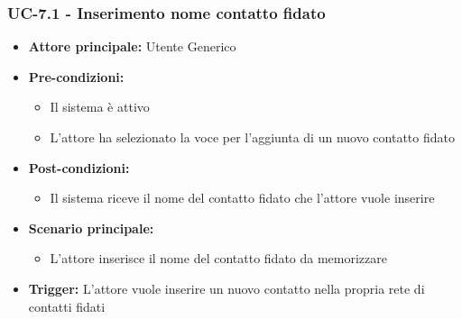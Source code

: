 \documentclass[a4paper,12pt]{article}
\begin{document}
\subsubsection{UC-7.1 - Inserimento nome contatto fidato} \label{subsec:UC-7.1}
\begin{itemize}
    \item \textbf{Attore principale:} Utente Generico
    \item \textbf{Pre-condizioni:}
    \begin{itemize}
        \item Il sistema è attivo
        \item L'attore ha selezionato la voce per l'aggiunta di un nuovo contatto fidato
    \end{itemize}
    \item \textbf{Post-condizioni:} 
    \begin{itemize}
        \item Il sistema riceve il nome del contatto fidato che l'attore vuole inserire
    \end{itemize}
    \item \textbf{Scenario principale:} 
    \begin{itemize}
        \item L'attore inserisce il nome del contatto fidato da memorizzare
    \end{itemize}
    \item \textbf{Trigger:} L'attore vuole inserire un nuovo contatto nella propria rete di contatti fidati
\end{itemize}
\end{document}
